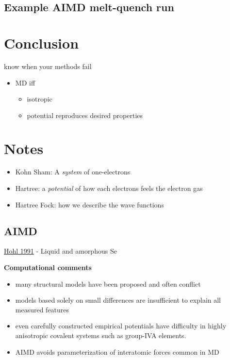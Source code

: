 \documentclass[3p,review,12pt]{elsarticle}
\newcommand{\vs}{\vspace{2mm}}
\begin{document}
\subsection{Example AIMD melt-quench run}

\section{Conclusion}
know when your methods fail
\begin{itemize}
	\item MD iff
	\begin{itemize}
		\item isotropic
		\item potential reproduces desired properties
	\end{itemize}
\end{itemize}




\pagebreak

\section*{Notes}

\begin{itemize}
	\item Kohn Sham: A \emph{system} of one-electrons
	\item Hartree: a \emph{potential} of how each electrons feels the electron gas
	\item Hartree Fock: how we describe the wave functions
\end{itemize}
\subsection{AIMD}
\underline{Hohl 1991}\cite{Hohl1991} - Liquid and amorphous Se \par \vs
\textbf{Computational comments}
\begin{itemize}
	\item many structural models have been proposed and often conflict
	\item models based solely on small differences are insufficient to explain all measured features
	\item even carefully constructed empirical potentials have difficulty in highly anisotropic covalent systems such as group-IVA elements.
	\item AIMD avoids parameterization of interatomic forces common in MD
\end{itemize}
\end{document}
